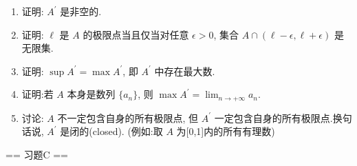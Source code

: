 \begin{enumerate}
    \item[1.]证明: $A^{\prime}$ 是非空的.

    \item[2.]证明: $\ell$ 是 $A$ 的极限点当且仅当对任意 $\epsilon >0$,
    集合 $A\cap (\ell -\epsilon,\ell +\epsilon)$ 是无限集.

    \item[3.]证明: $\displaystyle\sup A^{\prime} = \max A^{\prime}$, 即 $A^{\prime}$ 中存在最大数.

    \item[4.]证明:若 $A$ 本身是数列 $\{a_{n}\}$, 则 $\displaystyle\max A^{\prime} = \lim_{n\to +\infty}a_{n}$.

    \item[5.]讨论: $A$ 不一定包含自身的所有极限点, 但 $A^{\prime}$ 一定包含自身的所有极限点.换句话说, $A^{\prime}$ 是闭的(closed).
    (例如:取 $A$ 为[0,1]内的所有有理数)
\end{enumerate}

== 习题C ==

